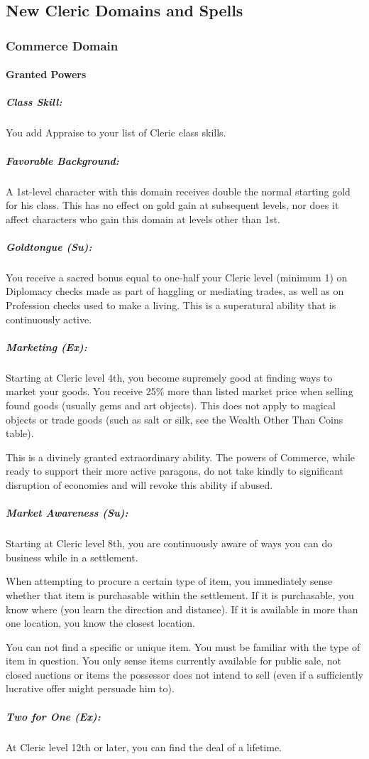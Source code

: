 \subsection{New Cleric Domains and Spells}
\label{sec:NewClericDomains}
\subsubsection{Commerce Domain}
\label{sec:CommerceDomain}
\paragraph{Granted Powers}
\subparagraph{Class Skill:}
You add Appraise to your list of Cleric class skills.
\subparagraph{Favorable Background:} A 1st-level character with this domain receives double the normal starting gold for his class. This has no effect on gold gain at subsequent levels, nor does it affect characters who gain this domain at levels other than 1st.
\subparagraph{Goldtongue (Su):}
You receive a sacred bonus equal to one-half your Cleric level (minimum 1) on Diplomacy checks made as part of haggling or mediating trades, as well as on Profession checks used to make a living.
This is a superatural ability that is continuously active.
\subparagraph{Marketing (Ex):}
Starting at Cleric level 4th, you become supremely good at finding ways to market your goods. You receive 25\% more than listed market price when selling found goods (usually gems and art objects). This does not apply to magical objects or trade goods (such as salt or silk, see the Wealth Other Than Coins table).

This is a divinely granted extraordinary ability. The powers of Commerce, while ready to support their more active paragons, do not take kindly to significant disruption of economies and will revoke this ability if abused.
\subparagraph{Market Awareness (Su):}
Starting at Cleric level 8th, you are continuously aware of ways you can do business while in a settlement.

When attempting to procure a certain type of item, you immediately sense whether that item is purchasable within the settlement.
If it is purchasable, you know where (you learn the direction and distance). If it is available in more than one location, you know the closest location.

You can not find a specific or unique item. You must be familiar with the type of item in question. You only sense items currently available for public sale, not closed auctions or items the possessor does not intend to sell (even if a sufficiently lucrative offer might persuade him to).
\subparagraph{Two for One (Ex):}
At Cleric level 12th or later, you can find the deal of a lifetime.

